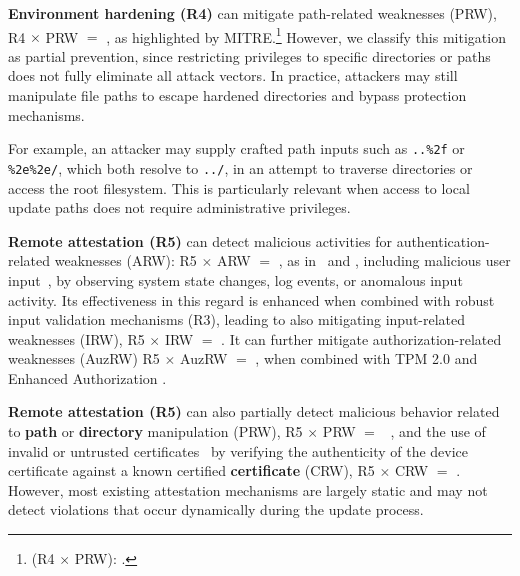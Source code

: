 \documentclass[fleqn,s1,names,tex]{neptune}
\begin{document}
\cvpt\textbf{Environment hardening (R4)} can mitigate path-related weaknesses (PRW),
R4 $\times$ PRW $=$ ,  as highlighted by MITRE.\footnote{(R4 $\times$ PRW):  .}   
However, we classify this mitigation as partial prevention, since restricting privileges to specific directories or paths does not fully eliminate all attack vectors. In practice, attackers may still manipulate file paths to escape hardened directories and bypass protection mechanisms.



For example, an attacker may supply crafted path inputs such as \texttt{..\%2f} or \texttt{\%2e\%2e/}, which both resolve to \texttt{../}, in an attempt to traverse directories or access the root filesystem. This is particularly relevant when access to local update paths does not require administrative privileges.






  

\cvpt\textbf{Remote attestation (R5)} can detect malicious activities for \ubrk  authentication-related weaknesses (ARW): 
R5 $\times$ ARW $=$ , 
as in~\citet{10.1145/3664476.3664485} and \citet{KHURSHID2023102952}, including malicious
user input~\citep{242026}, by observing system state changes, log events, or
anomalous input activity. 
Its effectiveness in this regard is enhanced when combined with robust input validation mechanisms (R3), leading to also mitigating input-related weaknesses (IRW), R5 $\times$ IRW $=$ .
It can further mitigate authorization-related weaknesses (AuzRW) R5 $\times$ AuzRW $=$ , 
when combined with TPM 2.0 and Enhanced
Authorization  \citep{10.1145/3627106.3627202}.




\cvpt\textbf{Remote attestation (R5)}
can also partially detect malicious behavior related to \textbf{path} or \textbf{directory} manipulation (PRW), 
R5 $\times$ PRW $=$ ~\citep{242026}, 
and the use of invalid or untrusted certificates~\citep{KHURSHID2023102952} by
verifying the authenticity of the device certificate against a known certified
\textbf{certificate} (CRW),
R5 $\times$ CRW $=$ .
However, most existing attestation mechanisms are largely static and may not detect violations that occur dynamically during the update process.
\end{document}
